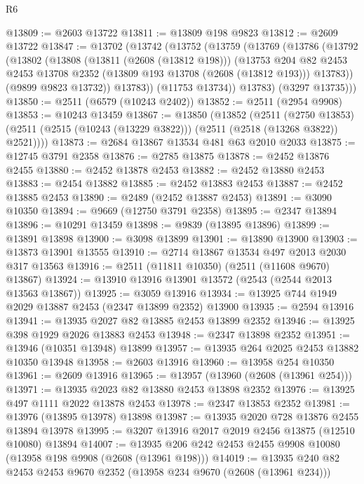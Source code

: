 \begin{lexlean}{R6}
\begin{coremodule}
@13809 := @2603 @13722
@13811 := @13809 @198 @9823
@13812 := @2609 @13722
@13847 := @13702
    (@13742
      (@13752
        (@13759
          (@13769
            (@13786
              (@13792
                (@13802
                  (@13808
                    (@13811 (@2608 (@13812 @198)))
                    (@13753
                      @204
                      @82
                      @2453
                      @2453
                      @13708
                      @2352
                      (@13809 @193 @13708 (@2608 (@13812 @193)))
                      @13783))
                  (@9899 @9823 @13732))
                @13783))
            (@11753 @13734))
          @13783)
        (@3297 @13735)))
@13850 := @2511 (@6579 (@10243 @2402))
@13852 := @2511 (@2954 @9908)
@13853 := @10243 @13459
@13867 := @13850
    (@13852
      (@2511
        (@2750 @13853)
        (@2511 (@2515 (@10243 (@13229 @3822))) (@2511 (@2518 (@13268 @3822)) @2521))))
@13873 := @2684 @13867 @13534 @481 @63 @2010 @2033
@13875 := @12745 @3791 @2358
@13876 := @2785 @13875
@13878 := @2452 @13876 @2455
@13880 := @2452 @13878 @2453
@13882 := @2452 @13880 @2453
@13883 := @2454 @13882
@13885 := @2452 @13883 @2453
@13887 := @2452 @13885 @2453
@13890 := @2489 (@2452 @13887 @2453)
@13891 := @3090 @10350
@13894 := @9669 (@12750 @3791 @2358)
@13895 := @2347 @13894
@13896 := @10291 @13459
@13898 := @9839 (@13895 @13896)
@13899 := @13891 @13898
@13900 := @3098 @13899
@13901 := @13890 @13900
@13903 := @13873 @13901 @13555
@13910 := @2714 @13867 @13534 @497 @2013 @2030 @317 @13563
@13916 := @2511 (@11811 @10350) (@2511 (@11608 @9670) @13867)
@13924 := @13910 @13916 @13901 @13572 (@2543 (@2544 @2013 @13563 @13867))
@13925 := @3059 @13916
@13934 := @13925 @744 @1949 @2029 @13887 @2453 (@2347 @13899 @2352) @13900
@13935 := @2594 @13916
@13941 := @13935 @2027 @82 @13885 @2453 @13899 @2352
@13946 := @13925 @398 @1929 @2026 @13883 @2453
@13948 := @2347 @13898 @2352
@13951 := @13946 (@10351 @13948) @13899
@13957 := @13935 @264 @2025 @2453 @13882 @10350 @13948
@13958 := @2603 @13916
@13960 := @13958 @254 @10350
@13961 := @2609 @13916
@13965 := @13957 (@13960 (@2608 (@13961 @254)))
@13971 := @13935 @2023 @82 @13880 @2453 @13898 @2352
@13976 := @13925 @497 @1111 @2022 @13878 @2453
@13978 := @2347 @13853 @2352
@13981 := @13976 (@13895 @13978) @13898
@13987 := @13935 @2020 @728 @13876 @2455 @13894 @13978
@13995 := @3207 @13916 @2017 @2019 @2456 @13875 (@12510 @10080) @13894
@14007 := @13935 @206 @242 @2453 @2455 @9908 @10080 (@13958 @198 @9908 (@2608 (@13961 @198)))
@14019 := @13935 @240 @82 @2453 @2453 @9670 @2352 (@13958 @234 @9670 (@2608 (@13961 @234)))

\end{coremodule}
\end{lexlean}
